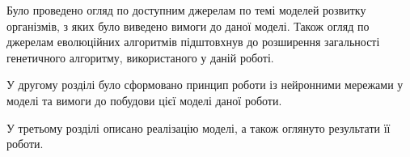 
\conclusions





Було проведено огляд по доступним джерелам по темі моделей розвитку
організмів, з яких було виведено вимоги до даної моделі.
Також огляд по джерелам еволюційних алгоритмів підштовхнув до розширення
загальності генетичного алгоритму, використаного у даній роботі.

У другому розділі було сформовано принцип роботи із нейронними мережами
у моделі та вимоги до побудови цієї моделі даної роботи.

У третьому розділі описано реалізацію моделі, а також оглянуто результати
її роботи. 








